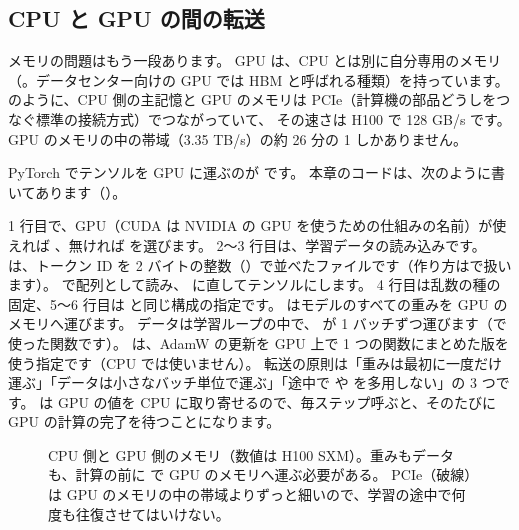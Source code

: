 \subsection*{CPU と GPU の間の転送}

メモリの問題はもう一段あります。
GPU は、CPU とは別に自分専用のメモリ（。データセンター向けの GPU では HBM と呼ばれる種類）を持っています。
のように、CPU 側の主記憶と GPU のメモリは PCIe（計算機の部品どうしをつなぐ標準の接続方式）でつながっていて、
その速さは H100 で 128 GB/s です。
GPU のメモリの中の帯域（3.35 TB/s）の約 26 分の 1 しかありません。


PyTorch でテンソルを GPU に運ぶのが  です。
本章のコードは、次のように書いてあります（）。


1 行目で、GPU（CUDA は NVIDIA の GPU を使うための仕組みの名前）が使えれば 、無ければ  を選びます。
2〜3 行目は、学習データの読み込みです。
 は、トークン ID を 2 バイトの整数（）で並べたファイルです（作り方はで扱います）。
 で配列として読み、 に直してテンソルにします。
4 行目は乱数の種の固定、5〜6 行目は  と同じ構成の指定です。
 はモデルのすべての重みを GPU のメモリへ運びます。
データは学習ループの中で、 が 1 バッチずつ運びます（で使った関数です）。
 は、AdamW の更新を GPU 上で 1 つの関数にまとめた版を使う指定です（CPU では使いません）。
転送の原則は「重みは最初に一度だけ運ぶ」「データは小さなバッチ単位で運ぶ」「途中で  や  を多用しない」の 3 つです。
 は GPU の値を CPU に取り寄せるので、毎ステップ呼ぶと、そのたびに GPU の計算の完了を待つことになります。

\begin{figure}[!tbp]
\centering
{}
\caption{CPU 側と GPU 側のメモリ（数値は H100 SXM）。重みもデータも、計算の前に  で GPU のメモリへ運ぶ必要がある。
PCIe（破線）は GPU のメモリの中の帯域よりずっと細いので、学習の途中で何度も往復させてはいけない。}
\label{fig:gpu-host-device}
\end{figure}


